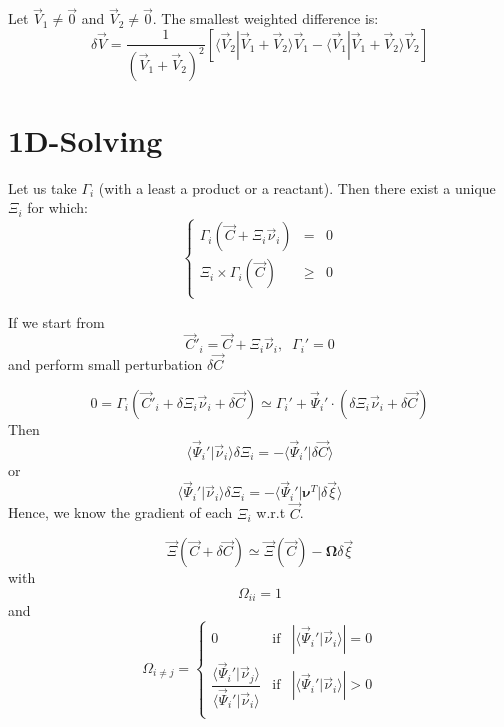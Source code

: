 \documentclass[aps,12pt]{revtex4}
\begin{document}
Let $\vec{V}_1\not=\vec{0}$ and $\vec{V}_2\not=\vec{0}$.
The smallest weighted difference is:
\begin{equation}
	\delta \vec{V} = \dfrac{1}{\left(\vec{V}_1+\vec{V}_2\right)^2} \left[ 
	\langle \vec{V}_2 | \vec{V}_1+\vec{V}_2 \rangle \vec{V}_1 - \langle \vec{V}_1 | \vec{V}_1+\vec{V}_2 \rangle \vec{V}_2
	\right]
\end{equation}

\section{1D-Solving}
Let us take $\Gamma_i$ (with a least a product or a reactant).
Then there exist a unique $\Xi_i$ for which:
\begin{equation}
\left\lbrace
\begin{array}{rcl}
	\Gamma_i(\vec{C} + \Xi_i \vec{\nu}_i ) & = & 0\\
	 \Xi_i \times \Gamma_i(\vec{C}) &\geq  &0\\
\end{array}
\right.
\end{equation}

If we start from
\begin{equation}
\vec{C}'_i = \vec{C} + \Xi_i \vec{\nu}_i,\;\;\Gamma_i' = 0
\end{equation}
and perform small perturbation $\delta\vec{C}$

\begin{equation}
0 = \Gamma_i( \vec{C}'_i + \delta\Xi_i \vec{\nu}_i + \delta\vec{C} ) \simeq \Gamma_i' + \vec{\Psi}_i' \cdot \left( \delta\Xi_i \vec{\nu}_i + \delta\vec{C} \right)
\end{equation}
Then
\begin{equation}
 \langle \vec{\Psi}_i'  \vert \vec{\nu}_i \rangle\delta\Xi_i = - \langle \vec{\Psi}_i' \vert \delta\vec{C}\rangle
\end{equation}
or
\begin{equation}
	\langle \vec{\Psi}_i'  \vert \vec{\nu}_i \rangle \delta\Xi_i = - \langle\vec{\Psi}_i' \vert \bm{\nu}^T \vert \delta \vec{\xi} \rangle
\end{equation}
Hence, we know the gradient of each $\Xi_i$ w.r.t $\vec{C}$.
 
\begin{equation}
	\vec{\Xi}(\vec{C}+\delta\vec{C}) \simeq  \vec{\Xi}(\vec{C}) -
	\bm{\Omega}
	\delta\vec{\xi}
\end{equation}  
with
\begin{equation}
	\Omega_{ii} = 1
\end{equation}
and
\begin{equation}
\Omega_{i\not=j} = 
\left\lbrace
	\begin{array}{ccl}
	0 & \text{if} & |\langle \vec{\Psi}_i'  \vert \vec{\nu}_i \rangle| = 0\\
	\dfrac{\langle \vec{\Psi}_i'  \vert \vec{\nu}_j \rangle}{\langle \vec{\Psi}_i'  \vert \vec{\nu}_i \rangle} & \text{if} & |\langle \vec{\Psi}_i'  \vert \vec{\nu}_i \rangle| > 0\\
	\end{array}
\right.
\end{equation}
\end{document}
